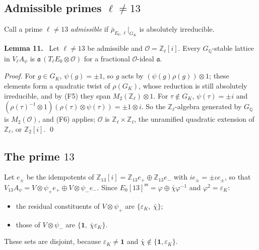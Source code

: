 \documentclass[11pt]{article}
\newenvironment{statement}[1]{\par\medskip\noindent\phantomsection\textbf{#1}\ }{\par\medskip}
\newcommand{\Q}{\mathbb Q}
\newcommand{\Z}{\mathbb Z}
\begin{document}
\subsection{Admissible primes \(\ell\neq13\)}\label{c2-lattices}

Call a prime \(\ell\neq13\) \emph{admissible} if \(\bar\rho_{E_0,\ell}|_{G_K}\) is absolutely irreducible.

\begin{statement}{Lemma 11.}\label{lemma-lattice}
Let \(\ell\neq13\) be admissible and \(\mathcal O=\Z_\ell[i]\). Every \(G_{\Q}\)-stable lattice in
          \(V_\ell A_\psi\) is \(\mathfrak a\,(T_\ell E_0\otimes\mathcal O)\) for a fractional \(\mathcal O\)-ideal
          \(\mathfrak a\).
\end{statement}

\emph{Proof.} For \(g\in G_K\), \(\psi(g)=\pm1\), so \(g\) acts by \((\psi(g)\rho(g))\otimes1\); these elements
      form a quadratic twist of \(\rho(G_K)\), whose reduction is still absolutely irreducible, and by (F5)
      they span \(M_2(\Z_\ell)\otimes1\). For \(\tau\notin G_K\), \(\psi(\tau)=\pm i\) and
      \((\rho(\tau)^{-1}\otimes1)(\rho(\tau)\otimes\psi(\tau))=\pm1\otimes i\). So the \(\Z_\ell\)-algebra generated by
      \(G_{\Q}\) is \(M_2(\mathcal O)\), and (F6) applies; \(\mathcal O\) is \(\Z_\ell\times\Z_\ell\), the unramified
      quadratic extension of \(\Z_\ell\), or \(\Z_2[i]\). \qed

\subsection{The prime \(13\)}\label{c2-thirteen}

Let \(e_\pm\) be the idempotents of \(\Z_{13}[i]=\Z_{13}e_+\oplus\Z_{13}e_-\) with \(ie_\pm=\pm\iota e_\pm\), so
      that \(V_{13}A_\psi=V\otimes\psi_+e_+\oplus V\otimes\psi_-e_-\). Since \(E_0[13]^{\mathrm{ss}}=\varphi\oplus\bar\chi\varphi^{-1}\)
      and \(\varphi^2=\varepsilon_K\):

\begin{itemize}
\item the residual constituents of \(V\otimes\psi_+\) are \(\{\varepsilon_K,\ \bar\chi\}\);
\item those of \(V\otimes\psi_-\) are \(\{\mathbf 1,\ \bar\chi\varepsilon_K\}\).
\end{itemize}

These sets are disjoint, because \(\varepsilon_K\neq\mathbf 1\) and \(\bar\chi\notin\{\mathbf 1,\varepsilon_K\}\).
\end{document}
